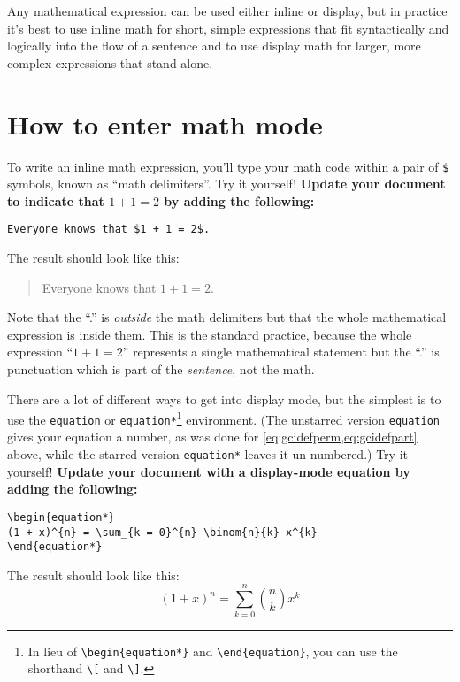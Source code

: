 \documentclass{article}
\newcommand*{\code}[1]{\texttt{#1}}
\newcommand*{\inst}[1]{\textbf{#1}}
\begin{document}
Any mathematical expression can be used either inline or display, but in practice it's best to use inline math for short, simple expressions that fit syntactically and logically into the flow of a sentence and to use display math for larger, more complex expressions that stand alone.

\section{How to enter math mode}
To write an inline math expression, you'll type your math code within a pair of \code{\$} symbols, known as \enquote{math delimiters}.
Try it yourself!
\inst{Update your document to indicate that $1 + 1 = 2$ by adding the following:}
\begin{verbatim}
Everyone knows that $1 + 1 = 2$.
\end{verbatim}
The result should look like this:
\begin{quote}
  Everyone knows that $1 + 1 = 2$.
\end{quote}

Note that the \enquote{.} is \emph{outside} the math delimiters but that the whole mathematical expression is inside them.
This is the standard practice, because the whole expression \enquote{$1 + 1 = 2$} represents a single mathematical statement but the \enquote{.} is punctuation which is part of the \emph{sentence}, not the math.

There are a lot of different ways to get into display mode, but the simplest is to use the \code{equation} or \code{equation*}\footnote{In lieu of \code{\textbackslash{}begin\{equation*\}} and \code{\textbackslash{}end\{equation\}}, you can use the shorthand \code{\textbackslash{}[} and \code{\textbackslash{}]}.} environment.
(The unstarred version \code{equation} gives your equation a number, as was done for \cref{eq:gcidefperm,eq:gcidefpart} above, while the starred version \code{equation*} leaves it un-numbered.)
Try it yourself!
\inst{Update your document with a display-mode equation by adding the following:}
\begin{verbatim}
\begin{equation*}
(1 + x)^{n} = \sum_{k = 0}^{n} \binom{n}{k} x^{k}
\end{equation*}
\end{verbatim}
The result should look like this:
\begin{equation*}
(1 + x)^{n} = \sum_{k = 0}^{n} \binom{n}{k} x^{k}
\end{equation*}
\end{document}
